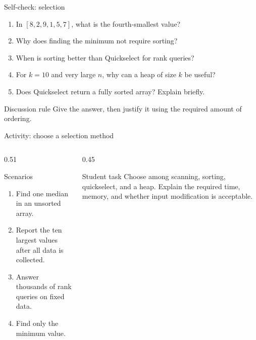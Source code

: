 \documentclass[aspectratio=169]{beamer}
\begin{document}
\begin{frame}{Self-check: selection}
  \small
  \begin{enumerate}
    \item In $[8,2,9,1,5,7]$, what is the fourth-smallest value?
    \item Why does finding the minimum not require sorting?
    \item When is sorting better than Quickselect for rank queries?
    \item For $k=10$ and very large $n$, why can a heap of size $k$ be useful?
    \item Does Quickselect return a fully sorted array? Explain briefly.
  \end{enumerate}
  \begin{block}{Discussion rule}
    Give the answer, then justify it using the required amount of ordering.
  \end{block}
\end{frame}

\begin{frame}{Activity: choose a selection method}
  \begin{columns}[T]
    \begin{column}{0.51\textwidth}
      \begin{block}{Scenarios}
        \begin{enumerate}
          \item Find one median in an unsorted array.
          \item Report the ten largest values after all data is collected.
          \item Answer thousands of rank queries on fixed data.
          \item Find only the minimum value.
        \end{enumerate}
      \end{block}
    \end{column}
    \begin{column}{0.45\textwidth}
      \begin{alertblock}{Student task}
        Choose among scanning, sorting, quickselect, and a heap. Explain the
        required time, memory, and whether input modification is acceptable.
      \end{alertblock}
    \end{column}
  \end{columns}
\end{frame}

\end{document}
